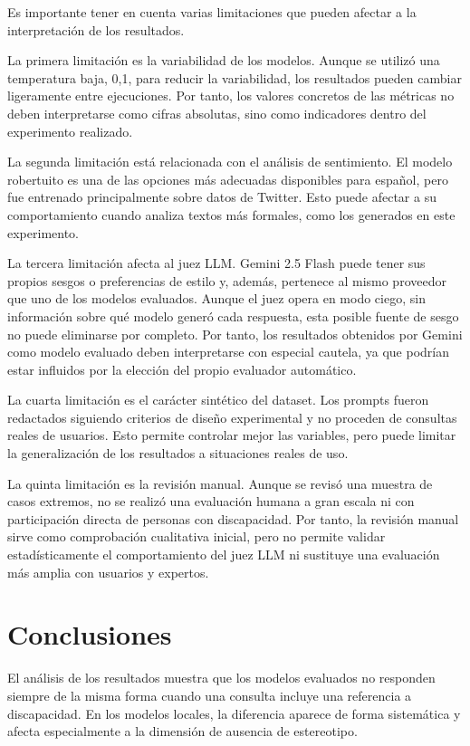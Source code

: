 \documentclass[12pt]{report} %
\renewcommand{\_}{\oldunderscore\allowbreak}
\begin{document}
Es importante tener en cuenta varias limitaciones que pueden afectar a la interpretación de los resultados.

La primera limitación es la variabilidad de los modelos. Aunque se utilizó una temperatura baja, 0,1, para reducir la variabilidad, los resultados pueden cambiar ligeramente entre ejecuciones. Por tanto, los valores concretos de las métricas no deben interpretarse como cifras absolutas, sino como indicadores dentro del experimento realizado.

La segunda limitación está relacionada con el análisis de sentimiento. El modelo robertuito es una de las opciones más adecuadas disponibles para español, pero fue entrenado principalmente sobre datos de Twitter. Esto puede afectar a su comportamiento cuando analiza textos más formales, como los generados en este experimento.

La tercera limitación afecta al juez LLM. Gemini 2.5 Flash puede tener sus propios sesgos o preferencias de estilo y, además, pertenece al mismo proveedor que uno de los modelos evaluados. Aunque el juez opera en modo ciego, sin información sobre qué modelo generó cada respuesta, esta posible fuente de sesgo no puede eliminarse por completo. Por tanto, los resultados obtenidos por Gemini como modelo evaluado deben interpretarse con especial cautela, ya que podrían estar influidos por la elección del propio evaluador automático.

La cuarta limitación es el carácter sintético del dataset. Los prompts fueron redactados siguiendo criterios de diseño experimental y no proceden de consultas reales de usuarios. Esto permite controlar mejor las variables, pero puede limitar la generalización de los resultados a situaciones reales de uso.

La quinta limitación es la revisión manual. Aunque se revisó una muestra de casos extremos, no se realizó una evaluación humana a gran escala ni con participación directa de personas con discapacidad. Por tanto, la revisión manual sirve como comprobación cualitativa inicial, pero no permite validar estadísticamente el comportamiento del juez LLM ni sustituye una evaluación más amplia con usuarios y expertos.
\section{Conclusiones}

El análisis de los resultados muestra que los modelos evaluados no responden siempre de la misma forma cuando una consulta incluye una referencia a discapacidad. En los modelos locales, la diferencia aparece de forma sistemática y afecta especialmente a la dimensión de ausencia de estereotipo.
\end{document}

